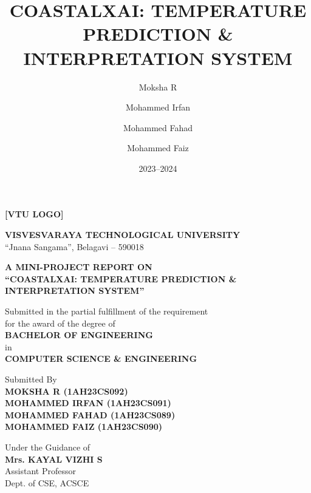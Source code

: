 \documentclass[12pt, a4paper]{article}
\title{COASTALXAI: TEMPERATURE PREDICTION \&\\
INTERPRETATION SYSTEM}
\author{Moksha R \and Mohammed Irfan \and Mohammed Fahad \and Mohammed Faiz}
\date{2023--2024}
\begin{document}
\thispagestyle{empty}

\begin{titlepage}
  \begin{center}
    \vspace*{0.5cm}

    \begin{tcolorbox}[colback=white, colframe=black, width=4cm, height=4cm,
                      halign=center, valign=center]
      \textbf{[VTU LOGO]}
    \end{tcolorbox}

    \vspace{0.5cm}
    {\large \textbf{VISVESVARAYA TECHNOLOGICAL UNIVERSITY}}\\
    \normalsize ``Jnana Sangama'', Belagavi -- 590018

    \vspace{1.5cm}
    {\large \textbf{A MINI-PROJECT REPORT ON}}\\[0.5cm]
    {\Large \textbf{``COASTALXAI: TEMPERATURE PREDICTION \&\\
    INTERPRETATION SYSTEM''}}

    \vspace{1cm}
    {\normalsize Submitted in the partial fulfillment of the requirement\\
    for the award of the degree of}\\[0.5cm]
    {\large \textbf{BACHELOR OF ENGINEERING}}\\
    \normalsize in\\
    {\large \textbf{COMPUTER SCIENCE \& ENGINEERING}}

    \vspace{1cm}
    {\normalsize Submitted By}\\[0.5cm]
    {\textbf{MOKSHA R (1AH23CS092)}\\
     \textbf{MOHAMMED IRFAN (1AH23CS091)}\\
     \textbf{MOHAMMED FAHAD (1AH23CS089)}\\
     \textbf{MOHAMMED FAIZ (1AH23CS090)}}

    \vspace{1cm}
    {\normalsize Under the Guidance of}\\[0.3cm]
    {\textbf{Mrs. KAYAL VIZHI S}\\
    \small Assistant Professor\\
    Dept. of CSE, ACSCE}


\end{center}
\end{titlepage}
\end{document}

